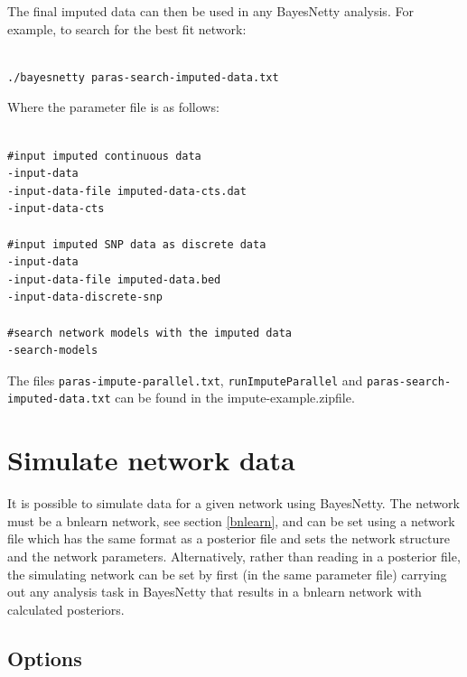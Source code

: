 \documentclass[a4paper,12pt]{article}
\newcommand{\code}[1]{{\footnotesize{{\tt #1}}}}
\begin{document}
The final imputed data can then be used in any BayesNetty analysis. For example, to search for the best fit network: 
\vspace{0.35cm} \begin{lstlisting}

./bayesnetty paras-search-imputed-data.txt

\end{lstlisting} \vspace{0.35cm}
Where the parameter file is as follows: 
\vspace{0.35cm} \begin{lstlisting}

#input imputed continuous data
-input-data
-input-data-file imputed-data-cts.dat
-input-data-cts

#input imputed SNP data as discrete data
-input-data
-input-data-file imputed-data.bed
-input-data-discrete-snp

#search network models with the imputed data
-search-models

\end{lstlisting} \vspace{0.35cm}
The files \code{paras-impute-parallel.txt}, \code{runImputeParallel} and \code{paras-search-imputed-data.txt} can be found in the impute-example.zipfile. 




\section{Simulate network data}
\label{sim-data}

It is possible to simulate data for a given network using BayesNetty. The network must be a bnlearn network, see  section \ref{bnlearn}, and can be set using a network file which has the same format as a posterior file and sets the network structure and the network parameters. Alternatively, rather than reading in a posterior file, the simulating network can be set by first (in the same parameter file) carrying out any analysis task in BayesNetty that results in a bnlearn network with calculated posteriors. 
\subsection{Options}
\label{sim-data-options}
\end{document}
